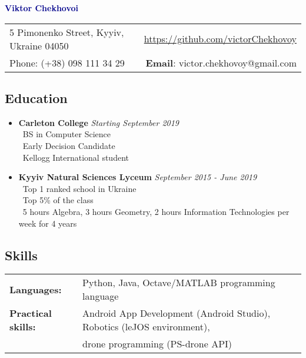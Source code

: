 \documentclass[letter,10pt]{extarticle}
\begin{document}
\begin{center}
\LARGE{\textcolor{darkblue}{\textbf{Viktor Chekhovoi}}}\\
\end{center}
\begin{tabular*}{\textwidth}{@{\extracolsep{\fill}}lr}
5 Pimonenko Street, Kyyiv, Ukraine 04050 &
{\url{https://github.com/victorChekhovoy}} \\
{Phone}: (+38) 098 111 34 29 & {\textbf{Email}: victor.chekhovoy@gmail.com}
\end{tabular*}
\noindent\makebox[\linewidth]{\rule{\textwidth}{0.4pt}}
\vspace{-1em}
\subsection*{Education}
\vspace{-0.5em}
\begin{itemize}
\item[]{\textbf{\large{Carleton College}}
  \hfill \emph{Starting September 2019}
 \vspace{0.1 em}  \\
  \textendash\ BS in Computer Science  \\
  \textendash\ Early Decision Candidate \\
  \textendash\ Kellogg International student}
\vspace{-0.5em}
\item[]{\textbf{\large{Kyyiv Natural Sciences Lyceum}} 
  \hfill \emph{September 2015 - June 2019} 
  \vspace{0.1 em}\\
  \textendash\ Top 1 ranked school in Ukraine \\
  \textendash\ Top 5\% of the class \\
  \textendash\ 5 hours Algebra, 3 hours Geometry, 2 hours Information Technologies per week for 4 years}
\end{itemize}
\vspace{-2em}
\subsection*{Skills}
\vspace{-0.5em}
\begin{tabular}{l l}
\textbf{Languages:} & Python, Java, Octave/MATLAB programming language\\
\textbf{Practical skills:} &  Android App Development (Android Studio), Robotics (leJOS environment),\\& drone programming (PS-drone API) \\
\end{tabular}
\vspace{-1.2em}
\end{document}
